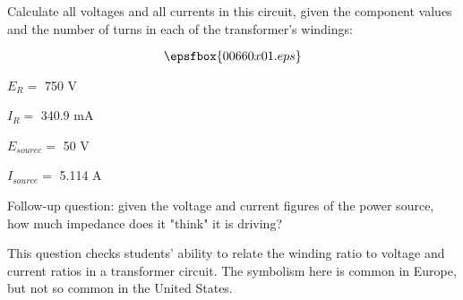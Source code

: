 

Calculate all voltages and all currents in this circuit, given the component values and the number of turns in each of the transformer's windings:

$$\epsfbox{00660x01.eps}$$







$E_R =$ 750 V

$I_R =$ 340.9 mA

\vskip 5pt

$E_{source} =$ 50 V

$I_{source} =$ 5.114 A

\vskip 10pt

Follow-up question: given the voltage and current figures of the power source, how much impedance does it "think" it is driving?







This question checks students' ability to relate the winding ratio to voltage and current ratios in a transformer circuit.  The symbolism here is common in Europe, but not so common in the United States.




